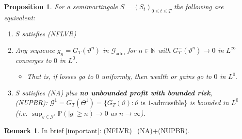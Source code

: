 \documentclass[12pt,a4paper, twoside]{article}
\newtheorem{prop}{Proposition}[section]
\theoremstyle{definition}
\newtheorem{rem}{Remark}[section]
\newcommand{\PP}{\mathbb{P}} %
\begin{document}
\begin{prop} \label{P43} For a semimartingale $S=(S_t)_{0 \leq t \leq T}$ the following are equivalent: 
\begin{enumerate}
\item $S$ satisfies (NFLVR) 
\item Any sequence $g_n= G_T( \vartheta^n)$ in $\mathcal{G}_\text{adm}$ for $n \in \mathbb{N}$ with $G_T^-( \vartheta^n) \to 0$ in $L^\infty$ converges to $0$ in $L^0$.
\begin{itemize}
\item That is, if losses go to $0$ uniformly, then wealth or gains go to $0$ in $L^0$. 
\end{itemize}
\item $S$ satisfies (NA) plus \textbf{no unbounded profit with bounded risk}, \\
(NUPBR): $\mathcal{G}^1 = G_T( \Theta^1)= \{ G_T( \vartheta): \vartheta \text{ is $1$-admissible}\}$ is bounded in $L^0$ (i.e. $\sup_{g \in \mathcal{G}^1} \PP( |g| \geq n) \to 0$ as $n \to \infty$).
\end{enumerate}
\end{prop}
\begin{rem} In brief [important]: (NFLVR)=(NA)+(NUPBR).
\end{rem}
\end{document}
